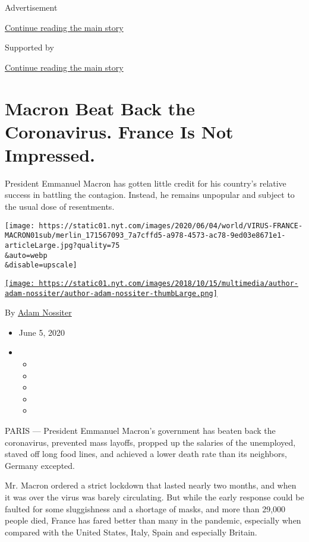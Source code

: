Advertisement

\protect\hyperlink{after-top}{Continue reading the main story}

Supported by

\protect\hyperlink{after-sponsor}{Continue reading the main story}

\hypertarget{macron-beat-back-the-coronavirus-france-is-not-impressed}{%
\section{Macron Beat Back the Coronavirus. France Is Not
Impressed.}\label{macron-beat-back-the-coronavirus-france-is-not-impressed}}

President Emmanuel Macron has gotten little credit for his country's
relative success in battling the contagion. Instead, he remains
unpopular and subject to the usual dose of resentments.

\texttt{[image: https://static01.nyt.com/images/2020/06/04/world/VIRUS-FRANCE-MACRON01sub/merlin\_171567093\_7a7cffd5-a978-4573-ac78-9ed03e8671e1-articleLarge.jpg?quality=75\\\&auto=webp\\\&disable=upscale]}

\href{https://www.nytimes.com/by/adam-nossiter}{\texttt{[image: https://static01.nyt.com/images/2018/10/15/multimedia/author-adam-nossiter/author-adam-nossiter-thumbLarge.png]}}

By \href{https://www.nytimes.com/by/adam-nossiter}{Adam Nossiter}

\begin{itemize}
\item
  June 5, 2020
\item
  \begin{itemize}
  \item
  \item
  \item
  \item
  \item
  \end{itemize}
\end{itemize}

PARIS --- President Emmanuel Macron's government has beaten back the
coronavirus, prevented mass layoffs, propped up the salaries of the
unemployed, staved off long food lines, and achieved a lower death rate
than its neighbors, Germany excepted.

Mr. Macron ordered a strict lockdown that lasted nearly two months, and
when it was over the virus was barely circulating. But while the early
response could be faulted for some sluggishness and a shortage of masks,
and more than 29,000 people died, France has fared better than many in
the pandemic, especially when compared with the United States, Italy,
Spain and especially Britain.

